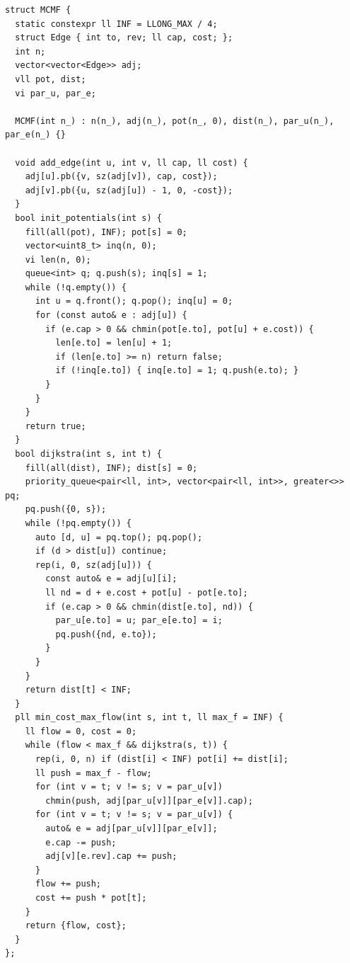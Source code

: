 \begin{lstlisting}
struct MCMF {
  static constexpr ll INF = LLONG_MAX / 4;
  struct Edge { int to, rev; ll cap, cost; };
  int n;
  vector<vector<Edge>> adj;
  vll pot, dist;
  vi par_u, par_e;

  MCMF(int n_) : n(n_), adj(n_), pot(n_, 0), dist(n_), par_u(n_), par_e(n_) {}

  void add_edge(int u, int v, ll cap, ll cost) {
    adj[u].pb({v, sz(adj[v]), cap, cost});
    adj[v].pb({u, sz(adj[u]) - 1, 0, -cost});
  }
  bool init_potentials(int s) {
    fill(all(pot), INF); pot[s] = 0;
    vector<uint8_t> inq(n, 0);
    vi len(n, 0);
    queue<int> q; q.push(s); inq[s] = 1;
    while (!q.empty()) {
      int u = q.front(); q.pop(); inq[u] = 0;
      for (const auto& e : adj[u]) {
        if (e.cap > 0 && chmin(pot[e.to], pot[u] + e.cost)) {
          len[e.to] = len[u] + 1;
          if (len[e.to] >= n) return false;
          if (!inq[e.to]) { inq[e.to] = 1; q.push(e.to); }
        }
      }
    }
    return true;
  }
  bool dijkstra(int s, int t) {
    fill(all(dist), INF); dist[s] = 0;
    priority_queue<pair<ll, int>, vector<pair<ll, int>>, greater<>> pq;
    pq.push({0, s});
    while (!pq.empty()) {
      auto [d, u] = pq.top(); pq.pop();
      if (d > dist[u]) continue;
      rep(i, 0, sz(adj[u])) {
        const auto& e = adj[u][i];
        ll nd = d + e.cost + pot[u] - pot[e.to];
        if (e.cap > 0 && chmin(dist[e.to], nd)) {
          par_u[e.to] = u; par_e[e.to] = i;
          pq.push({nd, e.to});
        }
      }
    }
    return dist[t] < INF;
  }
  pll min_cost_max_flow(int s, int t, ll max_f = INF) {
    ll flow = 0, cost = 0;
    while (flow < max_f && dijkstra(s, t)) {
      rep(i, 0, n) if (dist[i] < INF) pot[i] += dist[i];
      ll push = max_f - flow;
      for (int v = t; v != s; v = par_u[v])
        chmin(push, adj[par_u[v]][par_e[v]].cap);
      for (int v = t; v != s; v = par_u[v]) {
        auto& e = adj[par_u[v]][par_e[v]];
        e.cap -= push;
        adj[v][e.rev].cap += push;
      }
      flow += push;
      cost += push * pot[t];
    }
    return {flow, cost};
  }
};
\end{lstlisting}

